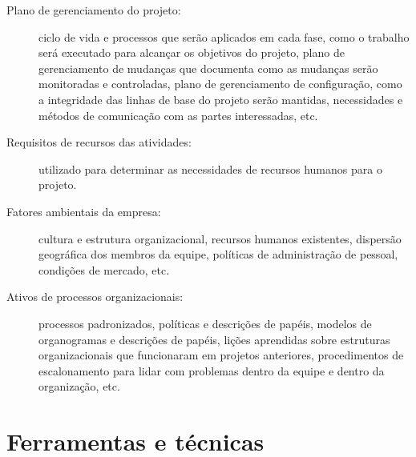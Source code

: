 \begin{description}
	
	\item[Plano de gerenciamento do projeto:] ciclo de vida e processos que serão aplicados em cada fase, como o trabalho será executado para alcançar os objetivos do projeto, plano de gerenciamento de mudanças que documenta como as mudanças serão monitoradas e controladas, plano de gerenciamento de configuração, como a integridade das linhas de base do projeto serão mantidas, necessidades e métodos de comunicação com as partes interessadas, etc.
	
	\item[Requisitos de recursos das atividades:] utilizado para determinar as necessidades de recursos humanos para o projeto.
	
	\item[Fatores ambientais da empresa:] cultura e estrutura organizacional, recursos humanos existentes, dispersão geográfica dos membros da equipe, políticas de administração de pessoal, condições de mercado, etc.
	
	\item[Ativos de processos organizacionais:] processos padronizados, políticas e descrições de papéis, modelos de organogramas e descrições de papéis, lições aprendidas sobre estruturas organizacionais que funcionaram em projetos anteriores, procedimentos de escalonamento para lidar com problemas dentro da equipe e dentro da organização, etc.
	

\end{description}

\section{Ferramentas e técnicas}

